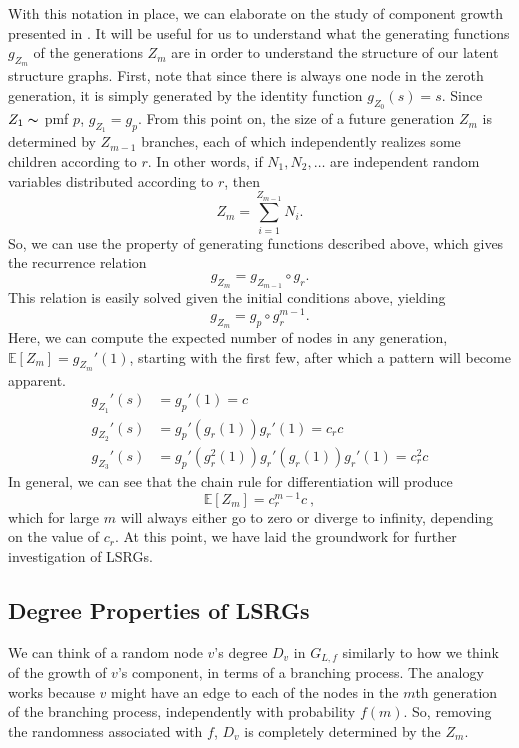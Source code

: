 \documentclass[12pt]{article}
\newcommand{\E}{\mathbb{E}}
\begin{document}
With this notation in place, we can elaborate on the study of component growth
presented in \cite{newman01}. It will be useful for us to understand
what the generating functions $g_{Z_m}$ of the generations $Z_m$ are
in order to understand the structure of our latent structure graphs.
First, note that since there is always one node in the zeroth generation,
it is simply generated by the identity function $g_{Z_0}(s) = s$.
Since $Z_1 \thicksim$ pmf $p$, $g_{Z_1} = g_p$. From this point on,
the size of a future generation $Z_m$ is determined by $Z_{m-1}$
branches, each of which independently realizes some children
according to $r$. In other words, if $N_1, N_2, \dotsc$ are
independent random variables distributed according to $r$, then
\[ Z_m = \sum_{i=1}^{Z_{m-1}} N_i. \] So, we can use the property
of generating functions described above, which gives the recurrence
relation \[ g_{Z_m} = g_{Z_{m-1}} \circ g_r. \] This relation
is easily solved given the initial conditions above, yielding
\[ g_{Z_m} = g_p \circ g_r^{m - 1}. \]
Here, we can compute the expected number of nodes in any generation,
$\E[Z_m]=g_{Z_m}'(1)$,
starting with the first few, after which a pattern will become apparent.
\begin{align*}
g_{Z_1}'(s) &= g_p'(1) = c \\
g_{Z_2}'(s) &= g_p'(g_r(1))g_r'(1) = c_r c \\
g_{Z_3}'(s) &= g_p'(g_r^2(1))g_r'(g_r(1))g_r'(1) = c_r^2 c
\end{align*}
In general, we can see that the chain rule for differentiation will
produce
\[ \E[Z_m] = c_r^{m-1}c\ , \]
which for large $m$ will always either go to zero or diverge to infinity,
depending on the value of $c_r$. At this point,
we have laid the groundwork for further investigation of LSRGs.

\subsection{\textbf{\textsf{Degree Properties of LSRGs}}}

We can think of a random node $v$'s degree $D_v$ in $G_{L,f}$ similarly
to how we think of the growth of $v$'s component, in terms of a branching
process. The analogy works because $v$ might have an edge to each of the nodes
in the $m$th generation of the branching process, independently with probability
$f(m)$. So, removing the randomness associated with $f$, $D_v$ is completely
determined by the $Z_m$.\par
\end{document}
